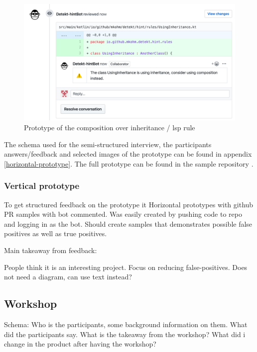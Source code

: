 \documentclass{article}
\begin{document}
\begin{figure}[h!]
    \centering
    \includegraphics[width=\textwidth]{../demo.png}
    \caption{Prototype of the composition over inheritance / \gls{lsp} rule}
    \label{fig:liskov}
\end{figure}


The schema used for the semi-structured interview, the participants answers/feedback and selected images of the prototype can be found in appendix \ref{horizontal-prototype}. The full prototype can be found in the sample repository \cite{sample-repository}. 

\subsubsection{Vertical prototype}
To get structured feedback on the prototype it 
Horizontal prototypes with github PR samples with bot commented. Was easily created by pushing code to repo and logging in as the bot. Should create samples that demonstrates possible false positives as well as true positives. 

Main takeaway from feedback: 

People think it is an interesting project.
Focus on reducing false-positives.
Does not need a diagram, can use text instead?


\subsection{Workshop}
Schema:
Who is the participants, some background information on them. What did the participants say. What is the takeaway from the workshop? What did i change in the product after having the workshop?
\end{document}
